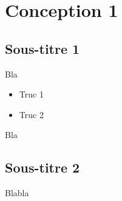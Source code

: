 
\section{Conception 1}

	\subsection{Sous-titre 1}

	Bla

	\begin{itemize}
		\item Truc 1
		\item Truc 2
	\end{itemize}

	Bla

	\subsection{Sous-titre 2}

		Blabla